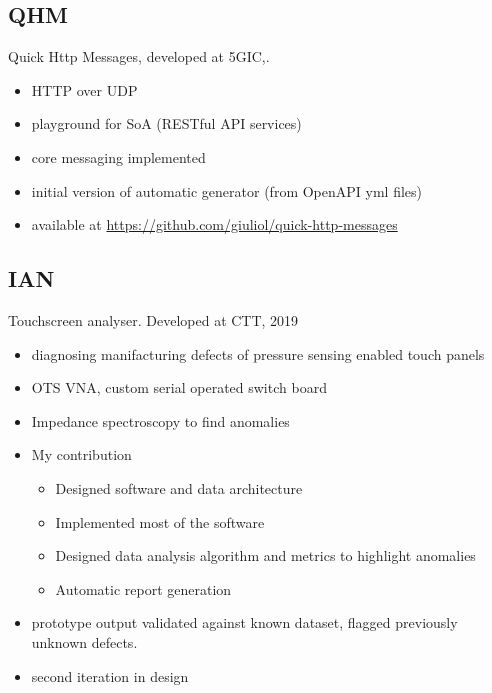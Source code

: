 \documentclass{if-beamer}
\begin{document}
\subsection{QHM}
\begin{frame}
Quick Http Messages, developed at 5GIC,.


\begin{itemize}
\item HTTP over UDP 
\item playground for SoA (RESTful API services)
\item core messaging implemented
\item initial version of automatic generator (from OpenAPI yml files) 
\item available at \url{https://github.com/giuliol/quick-http-messages}
\end{itemize}
\end{frame}

\subsection{IAN}
\begin{frame}

Touchscreen analyser. Developed at CTT, 2019


\begin{itemize}
\item diagnosing manifacturing defects of pressure sensing enabled touch panels
\item OTS VNA, custom serial operated switch board
\item Impedance spectroscopy to find anomalies
\item My contribution
\begin{itemize}
\item Designed software and data architecture
\item Implemented most of the software
\item Designed data analysis algorithm and metrics to highlight anomalies
\item Automatic report generation
\end{itemize}
\item prototype output validated against known dataset, flagged previously unknown defects.
\item second iteration in design
\end{itemize}
\end{frame}
\end{document}
